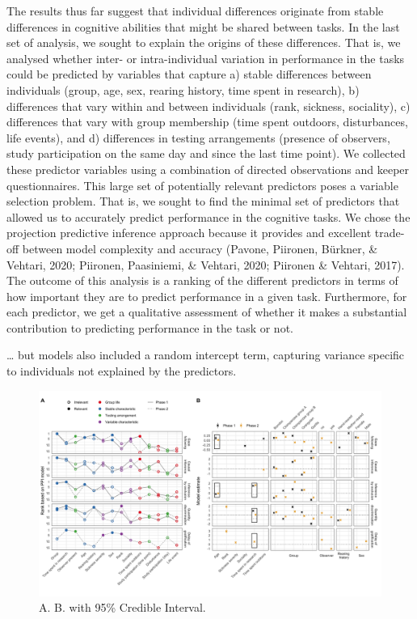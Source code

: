 \documentclass[
  man,floatsintext]{apa6}
\begin{document}
The results thus far suggest that individual differences originate from stable differences in cognitive abilities that might be shared between tasks. In the last set of analysis, we sought to explain the origins of these differences. That is, we analysed whether inter- or intra-individual variation in performance in the tasks could be predicted by variables that capture a) stable differences between individuals (group, age, sex, rearing history, time spent in research), b) differences that vary within and between individuals (rank, sickness, sociality), c) differences that vary with group membership (time spent outdoors, disturbances, life events), and d) differences in testing arrangements (presence of observers, study participation on the same day and since the last time point). We collected these predictor variables using a combination of directed observations and keeper questionnaires. This large set of potentially relevant predictors poses a variable selection problem. That is, we sought to find the minimal set of predictors that allowed us to accurately predict performance in the cognitive tasks. We chose the projection predictive inference approach because it provides and excellent trade-off between model complexity and accuracy (Pavone, Piironen, Bürkner, \& Vehtari, 2020; Piironen, Paasiniemi, \& Vehtari, 2020; Piironen \& Vehtari, 2017). The outcome of this analysis is a ranking of the different predictors in terms of how important they are to predict performance in a given task. Furthermore, for each predictor, we get a qualitative assessment of whether it makes a substantial contribution to predicting performance in the task or not.

\ldots{} but models also included a random intercept term, capturing variance specific to individuals not explained by the predictors.

\begin{figure}

{\centering \includegraphics[width=1\linewidth]{./figures/ppi3_i2} 

}

\caption{A.  B. with 95\% Credible Interval.}\label{fig:ppiplot}
\end{figure}
\end{document}
